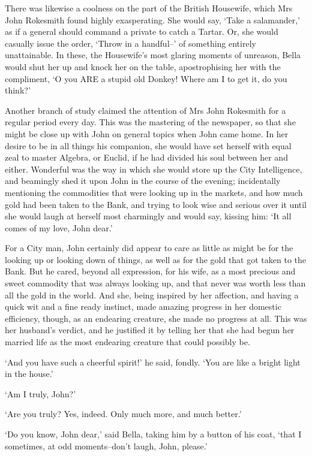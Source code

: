 There was likewise a coolness on the part of the British Housewife,
which Mrs John Rokesmith found highly exasperating. She would say,
‘Take a salamander,’ as if a general should command a private to catch
a Tartar. Or, she would casually issue the order, ‘Throw in a handful--’
of something entirely unattainable. In these, the Housewife’s most
glaring moments of unreason, Bella would shut her up and knock her on
the table, apostrophising her with the compliment, ‘O you ARE a stupid
old Donkey! Where am I to get it, do you think?’

Another branch of study claimed the attention of Mrs John Rokesmith for
a regular period every day. This was the mastering of the newspaper, so
that she might be close up with John on general topics when John came
home. In her desire to be in all things his companion, she would have
set herself with equal zeal to master Algebra, or Euclid, if he had
divided his soul between her and either. Wonderful was the way in which
she would store up the City Intelligence, and beamingly shed it
upon John in the course of the evening; incidentally mentioning the
commodities that were looking up in the markets, and how much gold had
been taken to the Bank, and trying to look wise and serious over it
until she would laugh at herself most charmingly and would say, kissing
him: ‘It all comes of my love, John dear.’

For a City man, John certainly did appear to care as little as might be
for the looking up or looking down of things, as well as for the gold
that got taken to the Bank. But he cared, beyond all expression, for his
wife, as a most precious and sweet commodity that was always looking up,
and that never was worth less than all the gold in the world. And she,
being inspired by her affection, and having a quick wit and a fine ready
instinct, made amazing progress in her domestic efficiency, though,
as an endearing creature, she made no progress at all. This was her
husband’s verdict, and he justified it by telling her that she had begun
her married life as the most endearing creature that could possibly be.

‘And you have such a cheerful spirit!’ he said, fondly. ‘You are like a
bright light in the house.’

‘Am I truly, John?’

‘Are you truly? Yes, indeed. Only much more, and much better.’

‘Do you know, John dear,’ said Bella, taking him by a button of his
coat, ‘that I sometimes, at odd moments--don’t laugh, John, please.’

